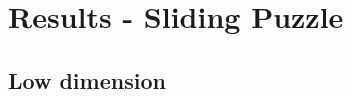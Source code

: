
\chapter{Results - Sliding Puzzle} %

\label{sec:ResultsSP} %


\section{Low dimension}
\label{sec:SPLowDimension}

